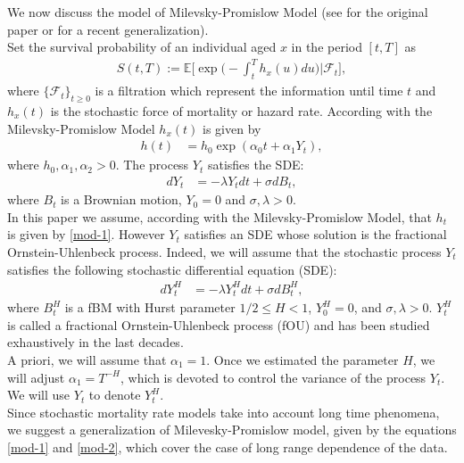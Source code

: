 \documentclass[smallextended]{svjour3}
\newcommand{\E}{\mathbb{E}}
\begin{document}
We now discuss the model of Milevsky-Promislow Model (see \cite{mi-pr} for the 
original paper
or \cite{gi-or-be}
for a recent generalization). \\

Set the survival probability of an individual aged $x$ in the period $[t,T]$ as
\begin{align}\label{E-surv}
    S(t,T):=\E\Big[\exp\Big(-\int_t^T h_x(u) du\Big)\Big|\mathcal{F}_t \Big],
\end{align}
where $\{\mathcal{F}_t\}_{t\ge 0} $ is a filtration which represent the 
information until time $t$ and $h_x(t)$ is the
stochastic force of mortality or hazard rate. According with the 
Milevsky-Promislow Model $h_x(t)$ is given by
\begin{align}
h(t)&=h_0\exp(\alpha_0t+\alpha_1Y_t),\label{mod-1}
\end{align}
where  $h_0,\alpha_1,\alpha_2> 0$. The process $Y_t$ satisfies the SDE:
\begin{align}
dY_t&=-\lambda Y_tdt+\sigma dB_t, \label{mod-3}
\end{align}
where $B_t$ is a Brownian motion, $Y_0=0$ and $\sigma,\lambda> 0$.\\


In this paper we assume, according with the Milevsky-Promislow Model, that 
$h_t$ is given by
\eqref{mod-1}. However $Y_t$ satisfies an SDE whose solution is the fractional 
Ornstein-Uhlenbeck process. Indeed,
we will assume that the stochastic process $Y_t$ satisfies the following 
stochastic differential
equation (SDE):
\begin{align}
dY_t^H&=-\lambda Y_t^Hdt+\sigma dB_t^H,  \label{mod-2}
\end{align}
where $B_t^H $ is a fBM with Hurst parameter $1/2 \le H< 1$, $Y_0^H=0$, and 
$\sigma,\lambda> 0$.
$Y_t^H$ is called a fractional Ornstein-Uhlenbeck process (fOU) and has been 
studied exhaustively
in the last decades. \\


A priori, we will assume that $\alpha_1=1$. Once we estimated the parameter 
$H$, we will
adjust $\alpha_1=T^{-H}$, which is devoted to control the variance of the 
process $Y_t$.
We will use $Y_t$ to denote $Y_t^H$.\\

Since stochastic mortality rate models take into account long time phenomena, we
suggest a generalization of Milevesky-Promislow model, given by the equations
\eqref{mod-1} and \eqref{mod-2}, which cover the case of long range dependence 
of
the data.\\
\end{document}
